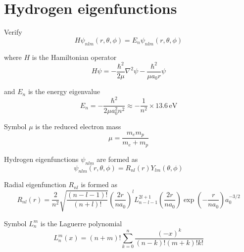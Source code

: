 

\section*{Hydrogen eigenfunctions}

Verify
\begin{equation*}
H\psi_{nlm}(r,\theta,\phi)=E_n\psi_{nlm}(r,\theta,\phi)
\end{equation*}

where $H$ is the Hamiltonian operator
\begin{equation*}
H\psi=-\frac{\hbar^2}{2\mu}\nabla^2\psi-\frac{\hbar^2}{\mu a_0r}\psi
\end{equation*}

and $E_n$ is the energy eigenvalue
\begin{equation*}
E_n=-\frac{\hbar^2}{2\mu a_0^2n^2}
\approx-\frac{1}{n^2}\times13.6\,\text{eV}
\end{equation*}

Symbol $\mu$ is the reduced electron mass
\begin{equation*}
\mu=\frac{m_e m_p}{m_e+m_p}
\end{equation*}

Hydrogen eigenfunctions $\psi_{nlm}$ are formed as
\begin{equation*}
\psi_{nlm}(r,\theta,\phi)=R_{nl}(r)Y_{lm}(\theta,\phi)
\end{equation*}

\iffalse
Quantum number $n$ is the principal quantum number.
\begin{equation*}
n=1,2,3,\ldots
\end{equation*}

Quantum number $l$ is the angular momentum quantum number.
\begin{equation*}
l=0,1,\ldots,n-1
\end{equation*}

Quantum number $m$ is the magnetic quantum number.
\begin{equation*}
m=-l,\ldots,0,\ldots,l
\end{equation*}
\fi

Radial eigenfunction $R_{nl}$ is formed as
\begin{equation*}
R_{nl}(r)=
\frac{2}{n^2}
\sqrt{\frac{(n-l-1)!}{(n+l)!}}
\left(\frac{2r}{na_0}\right)^l
L_{n-l-1}^{2l+1}\left(\frac{2r}{na_0}\right)
\exp\left(-\frac{r}{na_0}\right)
a_0^{-3/2}
\end{equation*}

Symbol $L_n^m$ is the Laguerre polynomial
\begin{equation*}
L_n^m(x)=(n+m)!\sum_{k=0}^n
\frac{(-x)^k}{(n-k)!(m+k)!k!}
\end{equation*}

